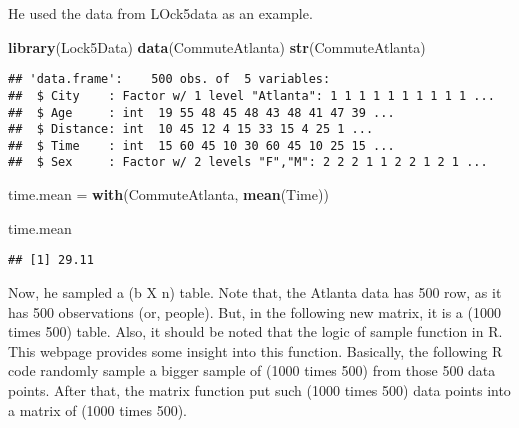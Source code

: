 \documentclass[]{book}
\newenvironment{Shaded}{\begin{snugshade}}{\end{snugshade}}
\newcommand{\DataTypeTok}[1]{\textcolor[rgb]{0.13,0.29,0.53}{#1}}
\newcommand{\DecValTok}[1]{\textcolor[rgb]{0.00,0.00,0.81}{#1}}
\newcommand{\KeywordTok}[1]{\textcolor[rgb]{0.13,0.29,0.53}{\textbf{#1}}}
\newcommand{\NormalTok}[1]{#1}
\newcommand{\OperatorTok}[1]{\textcolor[rgb]{0.81,0.36,0.00}{\textbf{#1}}}
\newcommand{\OtherTok}[1]{\textcolor[rgb]{0.56,0.35,0.01}{#1}}
\newcommand{\StringTok}[1]{\textcolor[rgb]{0.31,0.60,0.02}{#1}}
\begin{document}
He used the data from LOck5data as an example.

\begin{Shaded}
\begin{Highlighting}[]
\KeywordTok{library}\NormalTok{(Lock5Data)}
\KeywordTok{data}\NormalTok{(CommuteAtlanta)}
\KeywordTok{str}\NormalTok{(CommuteAtlanta)}
\end{Highlighting}
\end{Shaded}

\begin{verbatim}
## 'data.frame':    500 obs. of  5 variables:
##  $ City    : Factor w/ 1 level "Atlanta": 1 1 1 1 1 1 1 1 1 1 ...
##  $ Age     : int  19 55 48 45 48 43 48 41 47 39 ...
##  $ Distance: int  10 45 12 4 15 33 15 4 25 1 ...
##  $ Time    : int  15 60 45 10 30 60 45 10 25 15 ...
##  $ Sex     : Factor w/ 2 levels "F","M": 2 2 2 1 1 2 2 1 2 1 ...
\end{verbatim}

\begin{Shaded}
\begin{Highlighting}[]
\NormalTok{time.mean =}\StringTok{ }\KeywordTok{with}\NormalTok{(CommuteAtlanta, }\KeywordTok{mean}\NormalTok{(Time))}

\NormalTok{time.mean}
\end{Highlighting}
\end{Shaded}

\begin{verbatim}
## [1] 29.11
\end{verbatim}

Now, he sampled a (b X n) table. Note that, the Atlanta data has 500 row, as it has 500 observations (or, people). But, in the following new matrix, it is a (1000 times 500) table. Also, it should be noted that the logic of sample function in R. This webpage provides some insight into this function. Basically, the following R code randomly sample a bigger sample of (1000 times 500) from those 500 data points. After that, the matrix function put such (1000 times 500) data points into a matrix of (1000 times 500).

\begin{Shaded}
\end{Shaded}
\end{document}
